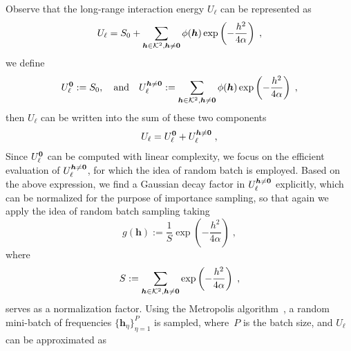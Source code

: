 Observe that the long-range interaction energy $U_\ell$ can be represented as
\[
U_\ell =   S_0+ \sum_{\boldsymbol{h}\in\mathcal{K}^2,\boldsymbol{h}\neq\bm{0}}\phi(\boldsymbol{h}) \exp\left(-\frac{h^2}{4\alpha}\right) \;,
\]
we define 
\begin{equation}\label{eq::U_l0_Ulk}
    U_\ell^{\bm{0}} := S_0,\quad\text{and}\quad U_\ell^{\boldsymbol{h}\neq \bm{0}} :=\sum_{\boldsymbol{h}\in\mathcal{K}^2,\boldsymbol{h}\neq\bm{0}}\phi(\boldsymbol{h}) \exp\left(-\frac{h^2}{4\alpha}\right) \;,
\end{equation}
then $U_\ell$ can be written into the sum of these two components
\[
U_\ell= U_\ell^{\bm{0}}+U_\ell^{\boldsymbol{h}\neq \bm{0}}\;,
\]
Since 
$ U_\ell^{\bm{0}}$
can be computed with linear complexity, we focus on the efficient evaluation of 
$U_\ell^{\boldsymbol{h}\neq \bm{0}}$, for which the idea of random batch is employed.
Based on the above expression, we find a Gaussian decay factor in $U_\ell^{\boldsymbol{h}\neq \bm{0}}$ explicitly, which can be normalized for the  purpose of importance sampling, so that again we apply the idea of random batch sampling taking
\begin{equation}\label{eq::hk_qem}
	g(\bm{h}) := \frac{1}{S} \exp\left(-\frac{h^2}{4\alpha}\right)\;, %
\end{equation}
where \[S:= \sum_{\boldsymbol{h}\in\mathcal{K}^2,\boldsymbol{h}\neq\bm{0}}\exp\left(-\frac{h^2}{4\alpha}\right)\;,\] serves as a normalization factor.
%
%
%
%
Using the Metropolis algorithm~\cite{metropolis1953equation}, a random mini-batch of frequencies $\{\bm{h}_{\eta}\}_{\eta=1}^P$ is sampled, where~$P$ is the batch size, and $U_\ell$ can be approximated as 
